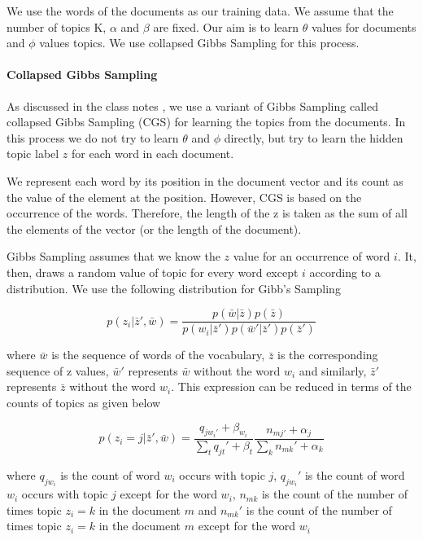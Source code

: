 \documentclass[11pt,a4paper,oneside]{article}
\begin{document}
We use the words of the documents as our training data. We assume that the number of topics K, $\alpha$ and $\beta$ are fixed. Our aim is to learn $\theta$ values for documents and $\phi$ values topics. We use collapsed Gibbs Sampling for this process.

\paragraph*{Collapsed Gibbs Sampling}

As discussed in the class notes \cite{classNotes}, we use a variant of Gibbs Sampling called collapsed Gibbs Sampling (CGS) for learning the topics from the documents. In this process we do not try to learn $\theta$ and $\phi$ directly, but try to learn the hidden topic label $z$ for each word in each document.

We represent each word by its position in the document vector and its count as the value of the element at the position. However, CGS is based on the occurrence of the words. Therefore, the length of the z is taken as the sum of all the elements of the vector (or the length of the document).

Gibbs Sampling assumes that we know the $z$ value for an occurrence of word $i$. It, then, draws a random value of topic for every word except $i$ according to a distribution. We use the following distribution for Gibb's Sampling

\begin{equation}
p(z_i|\bar{z}', \bar{w}) = \frac{p(\bar{w} | \bar{z}) p(\bar{z})}{p(w_i|\bar{z}')p(\bar{w}'|\bar{z}')p(\bar{z}')}
\end{equation}

where $\bar{w}$ is the sequence of words of the vocabulary, $\bar{z}$ is the corresponding sequence of z values, $\bar{w}'$ represents $\bar{w}$ without the word $w_i$ and similarly, $\bar{z}'$ represents $\bar{z}$ without the word $w_i$. This expression can be reduced in terms of the counts of topics as given below

\begin{equation}
\label{prob}
p(z_i = j | \bar{z}', \bar{w}) = \frac{q_{j w_{i}'} + \beta_{w_i}}{\sum_t{q_{jt}' + \beta_t}}\frac{n_{mj'} + \alpha_j}{\sum_k{n_{mk}' + \alpha_k}}
\end{equation}

where $q_{j w_i}$ is the count of word $w_i$ occurs with topic $j$, $q_{j w_i}'$ is the count of word $w_i$ occurs with topic $j$ except for the word $w_i$, $n_{mk}$ is the count of the number of times topic $z_i = k$ in the document $m$ and $n_{mk}'$ is the count of the number of times topic $z_i = k$ in the document $m$ except for the word $w_i$ 
\end{document}
